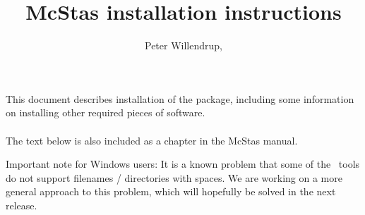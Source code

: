 \documentclass[a4paper,12pt]{article}
\title{McStas installation instructions}
\author{Peter
  Willendrup,\\\htmladdnormallink{peter.willendrup@risoe.dk}{mailto:peter.willendrup@risoe.dk}}
\begin{document}
\maketitle
\abstract \noindent This document describes installation of the
 package, including
some information on installing other required pieces of software.\\\
\\The text below is also included as a chapter in the McStas manual.


Important note for Windows users: It is a known problem that some of
the \MCS\ tools do not support filenames / directories with spaces.
We are working on a more general approach to this problem, which will
hopefully be solved in the next release.
\end{document}
